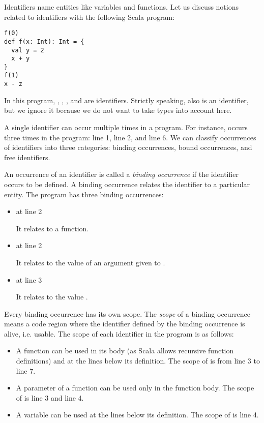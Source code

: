 Identifiers name entities like variables and functions.
Let us discuss notions related to identifiers with the following Scala program:

\begin{verbatim}
f(0)
def f(x: Int): Int = {
  val y = 2
  x + y
}
f(1)
x - z
\end{verbatim}

In this program, , , , and  are identifiers. Strictly speaking,
 also is an identifier, but we ignore it because we do not want to take
types into account here.

A single identifier can occur multiple times in a program. For instance,
 occurs three times in the program: line 1, line 2, and line 6.
We can classify occurrences of identifiers into three categories:
binding occurrences, bound occurrences, and free identifiers.

An occurrence of an identifier is called a \textit{binding occurrence}
if the identifier occurs to be defined. A binding occurrence relates the
identifier to a particular entity. The program has three binding occurrences:

\begin{itemize}
  \item {} at line 2

    It relates  to a function.

  \item {} at line 2

    It relates  to the value of an argument given to .

  \item {} at line 3

    It relates  to the value .
\end{itemize}

Every binding occurrence has its own scope. The \textit{scope} of a binding
occurrence means a code region where the identifier defined by the binding
occurrence is alive, i.e. usable. The scope of each identifier in the program is as follows:

\begin{itemize}
  \item {}

    A function can be used in its body (as Scala allows recursive function
    definitions) and at the lines below its definition. The scope of
     is from line 3 to line 7.

  \item {}

    A parameter of a function can be used only in the function body. The scope of
     is line 3 and line 4.

  \item {}

    A variable can be used at the lines below its definition. The scope of
     is line 4.
\end{itemize}

